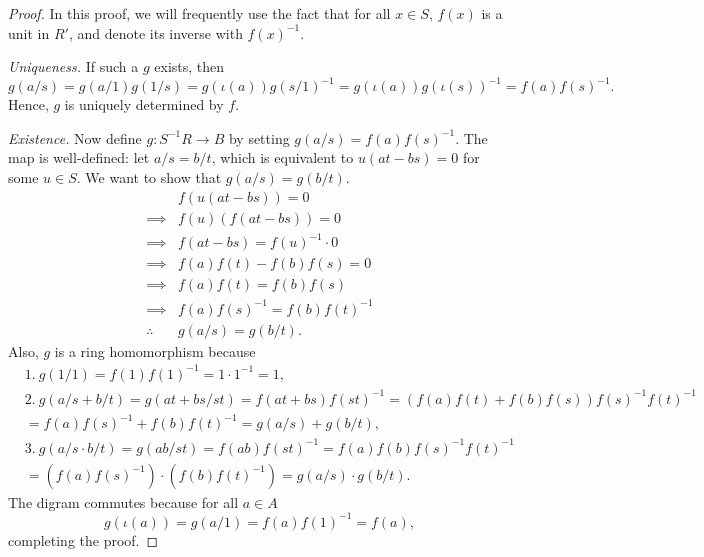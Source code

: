     \begin{proof}
        In this proof, we will frequently use the fact that for all \( x \in S \),  \( f(x) \) is a unit in  \( R' \), and denote its inverse with \( f(x)^{-1} \).

        \emph{Uniqueness.} If such a \( g \) exists, then
        \[
            g(a / s) = g(a / 1) g(1 / s) = g( \iota(a) ) g(s / 1)^{-1} = g( \iota(a)) g(\iota(s))^{-1} = f(a)f(s)^{-1}.
        \] 
        Hence, \( g \) is uniquely determined by  \( f \).

        \emph{Existence.} Now define \( g: S^{-1}R \to B \) by setting  \( g(a / s) = f(a) f(s)^{-1}\). The map is well-defined: let \( a / s = b / t \), which is equivalent to \( u(at - bs) = 0 \) for some  \( u \in S \). We want to show that  \( g(a / s) = g(b / t) \). 
        \begin{align*}
            &f(u(at - bs)) = 0\\
            \implies &f(u) (f(at - bs)) = 0\\
            \implies &f(at - bs) = f(u)^{-1} \cdot 0\\
            \implies &f(a) f(t) - f(b)f(s) = 0\\
            \implies &f(a) f(t) = f(b) f(s)\\
            \implies &f(a) f(s)^{-1}= f(b)f(t)^{-1}\\
            \therefore~&g(a / s) = g(b / t).
        \end{align*}
        Also, \( g \) is a ring homomorphism because
        \begin{align*}
            &1.~g(1 / 1) = f(1) f(1)^{-1} = 1 \cdot 1^{-1} = 1,\\
            &2.~g(a / s + b / t) = g(at + bs / st) =  f(at + bs)f(st)^{-1}= (f(a)f(t) + f(b)f(s)) f(s)^{-1} f(t)^{-1}\\
            &= f(a)f(s)^{-1} + f(b)f(t)^{-1} = g(a / s) + g(b / t),\\
            &3.~g(a / s \cdot b / t) = g(ab / st) =  f(ab) f(st)^{-1}= f(a) f(b)f(s)^{-1} f(t)^{-1} \\
            &=  ( f(a)f(s)^{-1}) \cdot (f(b)f(t)^{-1}) = g(a / s) \cdot g(b / t)
        .\end{align*}
        The digram commutes because for all \( a \in A \)
         \[
             g(\iota(a)) = g(a / 1) = f(a)f(1)^{-1}  = f(a),
        \]
        completing the proof.
    \end{proof}
